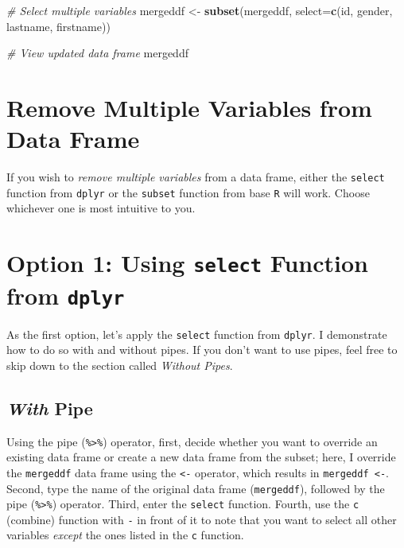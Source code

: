 \documentclass[]{book}
\newenvironment{Shaded}{\begin{snugshade}}{\end{snugshade}}
\newcommand{\KeywordTok}[1]{\textcolor[rgb]{0.13,0.29,0.53}{\textbf{#1}}}
\newcommand{\DataTypeTok}[1]{\textcolor[rgb]{0.13,0.29,0.53}{#1}}
\newcommand{\StringTok}[1]{\textcolor[rgb]{0.31,0.60,0.02}{#1}}
\newcommand{\CommentTok}[1]{\textcolor[rgb]{0.56,0.35,0.01}{\textit{#1}}}
\newcommand{\NormalTok}[1]{#1}
\begin{document}
\begin{Shaded}
\begin{Highlighting}[]
\CommentTok{# Select multiple variables}
\NormalTok{mergeddf <-}\StringTok{ }\KeywordTok{subset}\NormalTok{(mergeddf, }\DataTypeTok{select=}\KeywordTok{c}\NormalTok{(id, gender, lastname, firstname))}

\CommentTok{# View updated data frame}
\NormalTok{mergeddf}
\end{Highlighting}
\end{Shaded}

\section{Remove Multiple Variables from Data
Frame}\label{remove-multiple-variables-from-data-frame}

If you wish to \emph{remove multiple variables} from a data frame,
either the \texttt{select} function from \texttt{dplyr} or the
\texttt{subset} function from base \texttt{R} will work. Choose
whichever one is most intuitive to you.

\section{\texorpdfstring{Option 1: Using \texttt{select} Function from
\texttt{dplyr}}{Option 1: Using select Function from dplyr}}\label{option-1-using-select-function-from-dplyr-1}

As the first option, let's apply the \texttt{select} function from
\texttt{dplyr}. I demonstrate how to do so with and without pipes. If
you don't want to use pipes, feel free to skip down to the section
called \emph{Without Pipes}.

\subsection{\texorpdfstring{\emph{With}
Pipe}{With Pipe}}\label{with-pipe-1}

Using the pipe (\texttt{\%\textgreater{}\%}) operator, first, decide
whether you want to override an existing data frame or create a new data
frame from the subset; here, I override the \texttt{mergeddf} data frame
using the \texttt{\textless{}-} operator, which results in
\texttt{mergeddf\ \textless{}-}. Second, type the name of the original
data frame (\texttt{mergeddf}), followed by the pipe
(\texttt{\%\textgreater{}\%}) operator. Third, enter the \texttt{select}
function. Fourth, use the \texttt{c} (combine) function with \texttt{-}
in front of it to note that you want to select all other variables
\emph{except} the ones listed in the \texttt{c} function.
\end{document}
